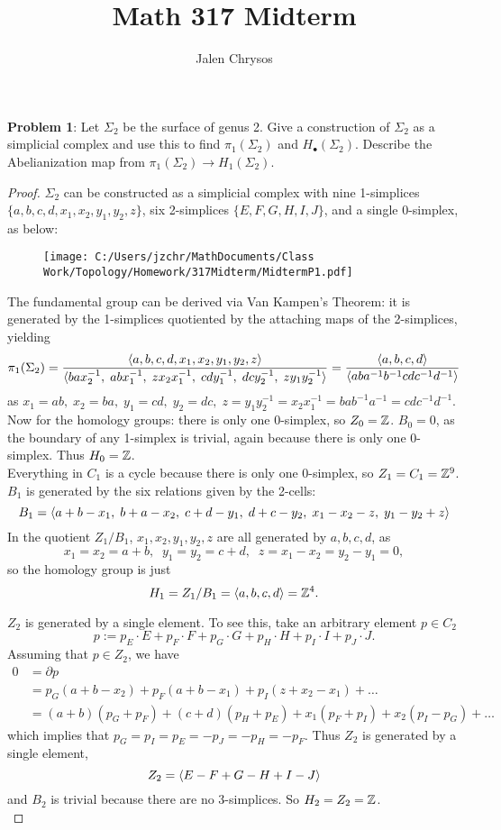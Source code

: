 \documentclass{amsart}
\title{Math 317 Midterm}
\author{Jalen Chrysos}
\begin{document}
	\maketitle
	\textbf{Problem 1}: Let $\Sigma_2$ be the surface of genus 2. Give a construction of $\Sigma_2$ as a simplicial complex and use this to find $\pi_1(\Sigma_2)$ and $H_{\bullet}(\Sigma_2)$. Describe the Abelianization map from $\pi_1(\Sigma_2)\to H_1(\Sigma_2)$.
	\begin{proof}
		$\Sigma_2$ can be constructed as a simplicial complex with nine 1-simplices $\{a,b,c,d,x_1,x_2,y_1,y_2,z\}$, six 2-simplices $\{E,F,G,H,I,J\}$, and a single 0-simplex, as below:
		\begin{figure}[h]
		\texttt{[image: C:/Users/jzchr/MathDocuments/Class Work/Topology/Homework/317Midterm/MidtermP1.pdf]}
		\end{figure}
		
		The fundamental group can be derived via Van Kampen's Theorem: it is generated by the 1-simplices quotiented by the attaching maps of the 2-simplices, yielding
		$$
		\pi_1(\Sigma_2) = \frac{\langle a,b,c,d,x_1,x_2,y_1,y_2,z\rangle}{\langle bax_2^{-1},\;abx_1^{-1},\;zx_2x_1^{-1},\;cdy_1^{-1},\;dcy_2^{-1},\;zy_1y_2^{-1}\rangle} = \frac{\langle a,b,c,d\rangle}{\langle aba^{-1}b^{-1}cdc^{-1}d^{-1}\rangle}
		$$
		as $x_1=ab,\;x_2=ba,\;y_1=cd,\;y_2=dc,\;z=y_1y_2^{-1}=x_2x_1^{-1} = bab^{-1}a^{-1} = cdc^{-1}d^{-1}$.\\
		
		Now for the homology groups: there is only one 0-simplex, so $Z_0=\mathbb{Z}$. $B_0=0$, as the boundary of any 1-simplex is trivial, again because there is only one 0-simplex. Thus $H_0=\mathbb{Z}$.\\
		
		Everything in $C_1$ is a cycle because there is only one 0-simplex, so $Z_1=C_1=\mathbb{Z}^9$. $B_1$ is generated by the six relations given by the 2-cells:
		$$
		B_1 = \langle a+b - x_1, \; b + a - x_2, \; c + d - y_1, \; d + c - y_2, \; x_1 - x_2 - z, \; y_1 - y_2 + z\rangle
		$$
		In the quotient $Z_1/B_1$, $x_1,x_2,y_1,y_2,z$ are all generated by $a,b,c,d$, as 
		$$x_1=x_2=a+b, \;\; y_1=y_2 = c +d, \;\; z = x_1 - x_2 = y_2 - y_1 = 0,$$
		so the homology group is just
		$$
		H_1 = Z_1/B_1 = \langle a,b,c,d\rangle = \mathbb{Z}^4. 
		$$
		
		\medspace 
		
		$Z_2$ is generated by a single element. To see this, take an arbitrary element $p\in C_2$
		$$
		p := p_E\cdot E + p_F\cdot F + p_G\cdot G + p_H \cdot H + p_I \cdot I + p_J \cdot J.
		$$
		Assuming that $p\in Z_2$, we have
		\begin{align*}
		0 &= \partial p \\
		&= p_G(a + b - x_2) + p_F (a + b - x_1) + p_I (z + x_2 - x_1) + \dots\\
		&= (a+b)(p_G + p_F) + (c+d)(p_H + p_E) + x_1(p_F + p_I) + x_2(p_I - p_G) + \dots
		\end{align*}
		which implies that $p_G=p_I=p_E= -p_J=-p_H=-p_F$. Thus $Z_2$ is generated by a single element,
		$$
		Z_2 = \langle E - F + G - H + I - J\rangle
		$$
		and $B_2$ is trivial because there are no 3-simplices. So $H_2=Z_2=\mathbb{Z}$.\\
		

\end{proof}
\end{document}
